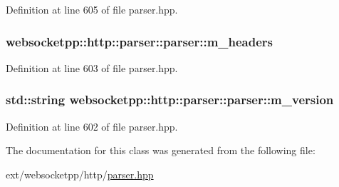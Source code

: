 Definition at line 605 of file parser.\+hpp.

\hypertarget{classwebsocketpp_1_1http_1_1parser_1_1parser_ae75e1e6acd17cc5a5543f818a5355a50}{}
\subsubsection[{m\+\_\+headers}]{ websocketpp\+::http\+::parser\+::parser\+::m\+\_\+headers\hspace{0.3cm}{\ttfamily [protected]}}\label{classwebsocketpp_1_1http_1_1parser_1_1parser_ae75e1e6acd17cc5a5543f818a5355a50}


Definition at line 603 of file parser.\+hpp.

\hypertarget{classwebsocketpp_1_1http_1_1parser_1_1parser_a3e8026fc40c96ca8bfa46a533e00d6a6}{}
\subsubsection[{m\+\_\+version}]{\setlength{\rightskip}{0pt plus 5cm}std\+::string websocketpp\+::http\+::parser\+::parser\+::m\+\_\+version\hspace{0.3cm}{\ttfamily [protected]}}\label{classwebsocketpp_1_1http_1_1parser_1_1parser_a3e8026fc40c96ca8bfa46a533e00d6a6}


Definition at line 602 of file parser.\+hpp.



The documentation for this class was generated from the following file\+:\begin{DoxyCompactItemize}
\item 
ext/websocketpp/http/\hyperlink{parser_8hpp}{parser.\+hpp}\end{DoxyCompactItemize}
